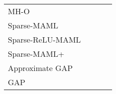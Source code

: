 \begin{table}[t!]
{\begin{tabular}{lccc}
    MH-O~\cite{zhao2020meta}                           & \quad \;                      & \quad \; \\
    Sparse-MAML~\cite{von2021learning}                 & \quad \;                      & \quad \; \\
    Sparse-ReLU-MAML~\cite{von2021learning}            & \quad \;                      & \quad \; \\
    Sparse-MAML+~\cite{von2021learning}           & \quad \;                      & \quad \; \\
    \midrule
    Approximate GAP                                    & \quad \;                      & \quad \; \\
    GAP                                              & \quad \;    & \quad \; \\
    \bottomrule
  \end{tabular}}
  \label{tab:miniImageNet}
\end{table}

